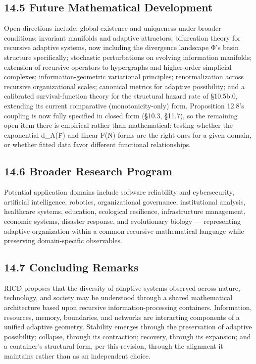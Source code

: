 \documentclass[
]{article}
\begin{document}
\hypertarget{future-mathematical-development}{%
\subsection{14.5 Future Mathematical
Development}\label{future-mathematical-development}}

Open directions include: global existence and uniqueness under broader
conditions; invariant manifolds and adaptive attractors; bifurcation
theory for recursive adaptive systems, now including the divergence
landscape Φ's basin structure specifically; stochastic perturbations on
evolving information manifolds; extension of recursive operators to
hypergraphs and higher-order simplicial complexes; information-geometric
variational principles; renormalization across recursive organizational
scales; canonical metrics for adaptive possibility; and a calibrated
survival-function theory for the structural hazard rate of §10.5b.0,
extending its current comparative (monotonicity-only) form. Proposition
12.8's coupling is now fully specified in closed form (§10.3, §11.7), so
the remaining open item there is empirical rather than mathematical:
testing whether the exponential d\_A(F̃) and linear F(N) forms are the
right ones for a given domain, or whether fitted data favor different
functional relationships.

\hypertarget{broader-research-program}{%
\subsection{14.6 Broader Research
Program}\label{broader-research-program}}

Potential application domains include software reliability and
cybersecurity, artificial intelligence, robotics, organizational
governance, institutional analysis, healthcare systems, education,
ecological resilience, infrastructure management, economic systems,
disaster response, and evolutionary biology --- representing adaptive
organization within a common recursive mathematical language while
preserving domain-specific observables.

\hypertarget{concluding-remarks}{%
\subsection{14.7 Concluding Remarks}\label{concluding-remarks}}

RICD proposes that the diversity of adaptive systems observed across
nature, technology, and society may be understood through a shared
mathematical architecture based upon recursive information-processing
containers. Information, resources, memory, boundaries, and networks are
interacting components of a unified adaptive geometry. Stability emerges
through the preservation of adaptive possibility; collapse, through its
contraction; recovery, through its expansion; and a container's
structural form, per this revision, through the alignment it maintains
rather than as an independent choice.
\end{document}
